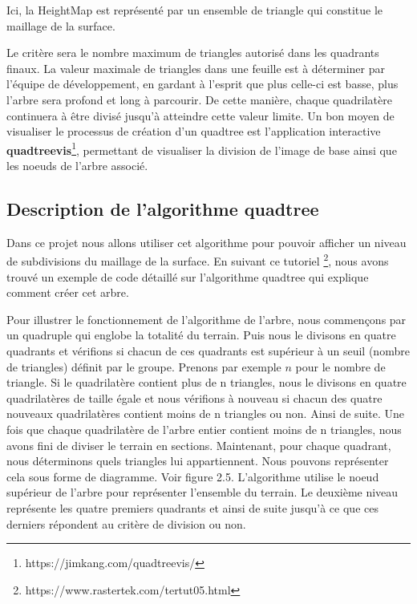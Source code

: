 \documentclass[12pt]{report}
\begin{document}
Ici, la HeightMap est représenté par un ensemble de triangle qui constitue le maillage de la surface. 

Le critère sera le nombre maximum de triangles autorisé dans les quadrants finaux. La valeur maximale de triangles dans une feuille est à déterminer par l'équipe de développement, en gardant à l'esprit que plus celle-ci est basse, plus l'arbre sera profond et long à parcourir. De cette manière, chaque quadrilatère continuera à être divisé jusqu'à atteindre cette valeur limite. Un bon moyen de visualiser le processus de création d'un quadtree est l'application interactive \textbf{quadtreevis}\footnote{https://jimkang.com/quadtreevis/}, permettant de visualiser la division de l'image de base ainsi que les noeuds de l'arbre associé.

\subsection{Description de l'algorithme quadtree}
Dans ce projet nous allons utiliser cet algorithme pour pouvoir afficher un niveau de subdivisions du maillage de la surface. En suivant ce tutoriel \footnote{https://www.rastertek.com/tertut05.html}, nous avons trouvé un exemple de code détaillé sur l'algorithme quadtree qui explique comment créer cet arbre.

Pour illustrer le fonctionnement de l'algorithme de l'arbre, nous commençons par un quadruple qui englobe la totalité du terrain. Puis nous le divisons en quatre quadrants et vérifions si chacun de ces quadrants est supérieur à un seuil (nombre de triangles) définit par le groupe. Prenons par exemple $n$ pour le nombre de triangle.  Si le quadrilatère contient plus de n triangles, nous le divisons en quatre quadrilatères de taille égale et nous vérifions à nouveau si chacun des quatre nouveaux quadrilatères contient moins de n triangles ou non. Ainsi de suite. Une fois que chaque quadrilatère de l'arbre entier contient moins de n triangles, nous avons fini de diviser le terrain en sections. Maintenant, pour chaque quadrant, nous déterminons quels triangles lui appartiennent. Nous pouvons représenter cela sous forme de diagramme. Voir figure 2.5. L'algorithme utilise le noeud supérieur de l'arbre pour représenter l'ensemble du terrain. Le deuxième niveau représente les quatre premiers quadrants et ainsi de suite jusqu'à ce que ces derniers répondent au critère de division ou non.

\vspace{0.3cm}
\end{document}
